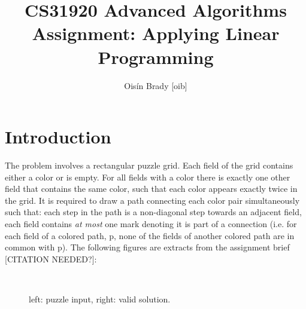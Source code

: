 \documentclass{homeworg}
\title{CS31920 Advanced Algorithms Assignment: Applying Linear Programming }
\author{Oisín Brady [oib]}
\begin{document}
\maketitle

\section{Introduction}
The problem involves a rectangular puzzle grid. Each field of the grid contains either a color or is empty. For all fields with a color there is exactly one other field that contains the same color, such that each color appears exactly twice in the grid. It is required to draw a path connecting each color pair simultaneously such that: each step in the path is a non-diagonal step towards an adjacent field, each field contains \textit{at most} one mark denoting it is part of a connection (i.e. for each field of a colored path, p, none of the fields of another colored path are in common with p). The following figures are extracts from the assignment brief [CITATION NEEDED?]:

\hspace*{-2.5em}
\begin{figure}[h]
        \centering
        \\
        \caption{left: puzzle input, right: valid solution.}
\end{figure}
\end{document}
